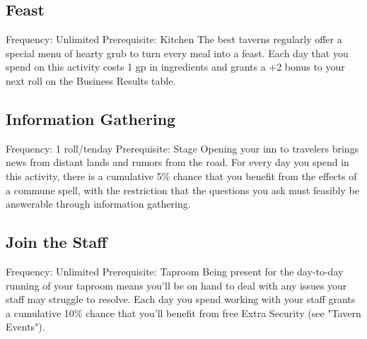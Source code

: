 \documentclass[10pt,a4paper,twoside,twocolumn,openany,bg=print,nodeprecatedcode]{dndbook}
\begin{document}
\subsection{Feast}
Frequency: Unlimited  Prerequisite: Kitchen
The best taverns regularly offer a special menu of hearty grub to turn every meal into a feast. Each day that you spend on this activity costs 1 gp in ingredients and grants a +2 bonus to your next roll on the Business Results table.
\subsection{Information Gathering}
Frequency: 1 roll/tenday Prerequisite: Stage
Opening your inn to travelers brings news from distant lands and rumors from the road. For every day you spend in this activity, there is a cumulative 5\% chance that you benefit from the effects of a commune spell, with the restriction that the questions you ask must feasibly be answerable through information gathering.
\subsection{Join the Staff}
Frequency: Unlimited Prerequisite: Taproom
Being present for the day-to-day running of your taproom means you'll be on hand to deal with any issues your staff may struggle to resolve. Each day you spend working with your staff grants a cumulative 10\% chance that you'll benefit from free Extra Security (see "Tavern Events").
\end{document}
